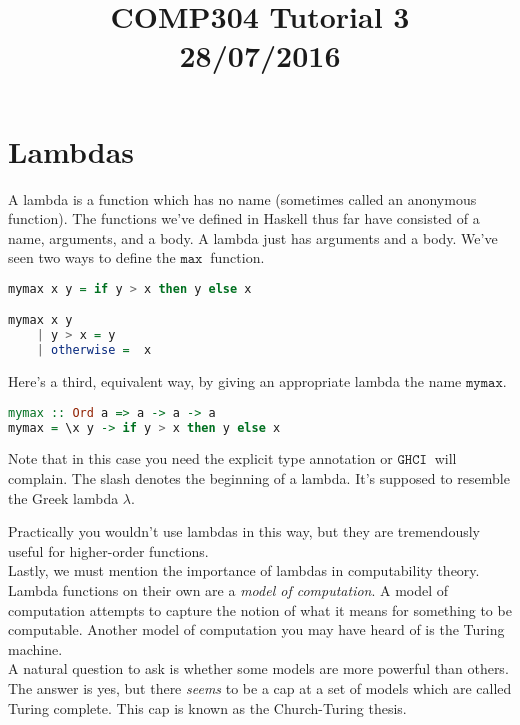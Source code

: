 \documentclass[a4paper,12pt]{article}
\newcommand{\kwa}[1]{\mathtt{#1}}
\newcommand{\kw}[1]{\kwa{#1}~}
\begin{document}
\title{COMP304 Tutorial 3 \\ 28/07/2016}
\date{}
\maketitle

\noindent
\section{Lambdas}

\noindent
A lambda is a function which has no name (sometimes called an anonymous function). The functions we've defined in Haskell thus far have consisted of a name, arguments, and a body. A lambda just has arguments and a body. We've seen two ways to define the $\kw{max}$ function.

\begin{lstlisting}[language=Haskell]
mymax x y = if y > x then y else x

mymax x y
	| y > x = y
	| otherwise =  x
\end{lstlisting}

\noindent
Here's a third, equivalent way, by giving an appropriate lambda the name $\kwa{mymax}$.

\begin{lstlisting}[language=Haskell]
mymax :: Ord a => a -> a -> a
mymax = \x y -> if y > x then y else x
\end{lstlisting}

\noindent
Note that in this case you need the explicit type annotation or $\kw{GHCI}$ will complain. The slash denotes the beginning of a lambda. It's supposed to resemble the Greek lambda $\lambda$.

\noindent
Practically you wouldn't use lambdas in this way, but they are tremendously useful for higher-order functions. \\

\noindent
Lastly, we must mention the importance of lambdas in computability theory. Lambda functions on their own are a \textit{model of computation}. A model of computation attempts to capture the notion of what it means for something to be computable. Another model of computation you may have heard of is the Turing machine. \\

\noindent
A natural question to ask is whether some models are more powerful than others. The answer is yes, but there \textit{seems} to be a cap at a set of models which are called Turing complete. This cap is known as the Church-Turing thesis. \\
\end{document}
